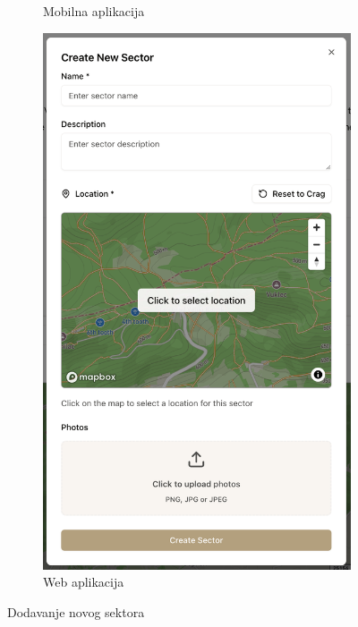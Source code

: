 \begin{figure}[H]
\begin{subfigure}[b]{0.36\textwidth}
        \caption{Mobilna aplikacija}
        \label{fig:dodavanje_sektora_mob}
    \end{subfigure}
    \hfill
    \begin{subfigure}[b]{0.45\textwidth}
        \centering
        \includegraphics[width=\textwidth]{images/implementacija/web/editing-options/create-sector.png}
        \caption{Web aplikacija}
        \label{fig:dodavanje_sektora_web}
    \end{subfigure}
    \caption{Dodavanje novog sektora}
    \label{fig:dodavanje_sektora}
\end{figure}

